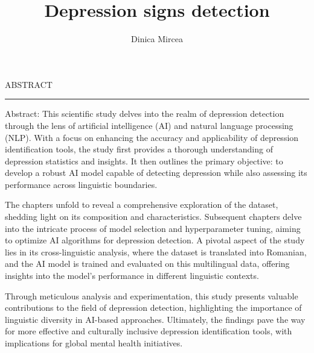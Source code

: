 \documentclass[12pt]{report}
\begin{document}
\title{Depression signs detection}					   
\author{Dinica Mircea}											
				
\maketitle


\newpage
\thispagestyle{empty}
\mbox{}
\newpage
{} 

\cleardoublepage
ABSTRACT
\vspace{0.5cm}	
\hrule
\vspace{0.5cm}	

Abstract: This scientific study delves into the realm of depression detection through the lens of artificial intelligence (AI) and natural language processing (NLP). With a focus on enhancing the accuracy and applicability of depression identification tools, the study first provides a thorough understanding of depression statistics and insights. It then outlines the primary objective: to develop a robust AI model capable of detecting depression while also assessing its performance across linguistic boundaries.

The chapters unfold to reveal a comprehensive exploration of the dataset, shedding light on its composition and characteristics. Subsequent chapters delve into the intricate process of model selection and hyperparameter tuning, aiming to optimize AI algorithms for depression detection. A pivotal aspect of the study lies in its cross-linguistic analysis, where the dataset is translated into Romanian, and the AI model is trained and evaluated on this multilingual data, offering insights into the model's performance in different linguistic contexts.

Through meticulous analysis and experimentation, this study presents valuable contributions to the field of depression detection, highlighting the importance of linguistic diversity in AI-based approaches. Ultimately, the findings pave the way for more effective and culturally inclusive depression identification tools, with implications for global mental health initiatives.



\tableofcontents


\newpage
{}










\end{document}
